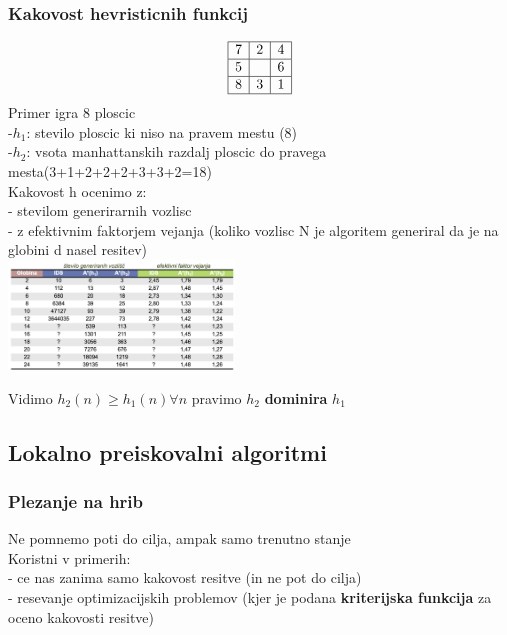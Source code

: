 \subsubsection{Kakovost hevristicnih funkcij}
$$\begin{array}{|c|c|c|}
    \hline
    7 & 2 & 4 \\
    \hline 
    5 & & 6 \\
    \hline 
    8 & 3 & 1 \\
    \hline 
\end{array}\\$$
Primer igra 8 ploscic\\
-$h_1$: stevilo ploscic ki niso na pravem mestu (8)\\
-$h_2$: vsota manhattanskih razdalj ploscic do pravega mesta(3+1+2+2+2+3+3+2=18)\\
Kakovost h ocenimo z:\\
- stevilom generirarnih vozlisc\\
- z efektivnim faktorjem vejanja (koliko vozlisc N je algoritem generiral da je na globini d nasel resitev)\\

\includegraphics[width=6cm]{./images/kakovost-h(n).png}

Vidimo $h_2(n) \geq h_1(n) \forall n$ pravimo $h_2$ \textbf{dominira} $h_1$\\


\subsection{Lokalno preiskovalni algoritmi}

\subsubsection{Plezanje na hrib}
Ne pomnemo poti do cilja, ampak samo trenutno stanje\\
Koristni v primerih:\\
- ce nas zanima samo kakovost resitve (in ne pot do cilja)\\
- resevanje optimizacijskih problemov (kjer je podana \textbf{kriterijska funkcija} za oceno kakovosti resitve)\\

